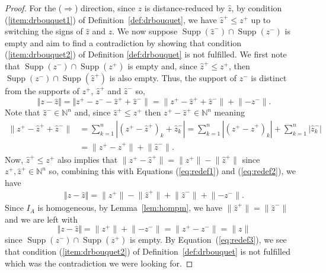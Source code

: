 \documentclass[a4paper, 12pt]{article}
\newcommand{\NN}{\mathbb N}
\theoremstyle{plain}
\theoremstyle{definition}
\theoremstyle{remark}
\begin{document}
\begin{proof}
    For the ($\Rightarrow$) direction, since $z$ is distance-reduced by $\hat z$, by condition (\ref{item:drbouquet1}) of Definition~\ref{def:drbouquet}, we have $\hat z^+ \le z^+$ up to switching the signs of $\hat z$ and $z$. We now suppose $\operatorname{Supp}(\hat z^{-}) \cap \operatorname{Supp}(z^{-})$ is empty and aim to find a contradiction by showing that condition (\ref{item:drbouquet2}) of Definition \ref{def:drbouquet} is not fulfilled. We first note that $\operatorname{Supp}(z^{-}) \cap \operatorname{Supp}(z^{+})$ is empty and, since $\hat z^{+} \le z^{+}$, then $\operatorname{Supp}(z^{-}) \cap \operatorname{Supp}(\hat z^{+})$ is also empty. Thus, the support of $z^{-}$ is distinct from the supports of $z^{+}$, $\hat z^{+}$ and $\hat z^{-}$ so,
\begin{equation}\label{eq:redef1}
 \Vert z - \hat z \Vert =\Vert  z^{+} - z^{-} -  \hat z^{+} + \hat z^{-} \rVert
        =\lVert  z^{+} -  \hat z^{+} + \hat z^{-}\rVert + \lVert - z^{-}\rVert.
\end{equation}
Note that $\hat z^{-} \in \NN^n$ and, since $\hat z^{+} \le z^{+}$ then $z^{+}-\hat z^{+} \in \NN^n$ meaning 
\begin{align}\label{eq:redef2}
 \lVert  z^{+} -  \hat z^{+} + \hat z^{-}\rVert&=\sum_{k=1}^n |(z^{+} -  \hat z^{+})_k + \hat z_k^{-}|=\sum_{k=1}^n |(z^{+} -  \hat z^{+})_k | + \sum_{k=1}^n|\hat z_k^{-}|\\ \nonumber
 &=\lVert  z^{+} -  \hat z^{+} \rVert + \lVert \hat z^{-}\rVert.
\end{align}
    Now, $\hat z^{+} \le z^{+}$ also implies that $\lVert z^{+} - \hat z^{+} \rVert = \lVert z^{+} \rVert - \lVert \hat z^{+} \rVert$ since $z^+,\hat z^+ \in \NN^n$ so, combining this with Equations (\ref{eq:redef1}) and (\ref{eq:redef2}), we have
    \begin{align*}
        \Vert z - \hat z \Vert=\lVert  z^{+} \rVert -  \lVert \hat z^{+} \rVert +  \lVert\hat z^{-}\rVert + \lVert - z^{-}\rVert.
    \end{align*}
    Since $I_A$ is homogeneous, by Lemma~\ref{lem:hompm}, we have $\lVert \hat z^+ \rVert = \lVert \hat z^- \rVert$ and we are left with
    \begin{equation} \label{eq:redef3}
        \Vert z - \hat z \Vert=\lVert  z^{+} \rVert+\lVert - z^{-}\rVert=\lVert  z^{+} - z^{-}\rVert=\lVert z \rVert
    \end{equation}
    since $\operatorname{Supp}(z^{-}) \cap \operatorname{Supp}(z^{+})$ is empty. By Equation~(\ref{eq:redef3}), we see that condition (\ref{item:drbouquet2}) of Definition~\ref{def:drbouquet} is not fulfilled which was the contradiction we were looking for.


\end{proof}
\end{document}
